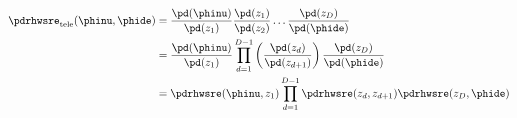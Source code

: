 \begin{align}
  \pdrhwsre_{\text{tele}}(\phinu, \phide) &= 
    \frac {\pd(\phinu)} {\pd(z_{1})}
    \frac {\pd(z_{1})} {\pd(z_{2})}
    \ldots
    \frac {\pd(z_{D})} {\pd(\phide)} \\
    &= 
    \frac {\pd(\phinu)} {\pd(z_{1})}
    \prod_{d = 1}^{D - 1}
     \left( \frac {\pd(z_{d})} {\pd(z_{d + 1})} \right)
    \frac {\pd(z_{D})} {\pd(\phide)} \\
    &= 
    \pdrhwsre(\phinu, z_{1})
    \prod_{d = 1}^{D - 1}
    \pdrhwsre(z_{d}, z_{d + 1})
    \pdrhwsre(z_{D}, \phide) \label{eqn:telescoping-definition-3}
\end{align}